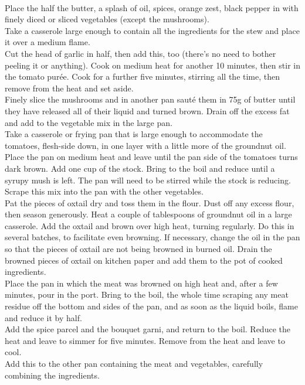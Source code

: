 \documentclass{tufte-book}
\begin{document}
\smallskip
{} 
\\Place the half the butter, a splash of oil, spices, orange zest, black pepper in with finely diced or sliced vegetables (except the mushrooms).
\\Take a casserole large enough to contain all the ingredients for the stew and place it over a medium flame.
\\ Cut the head of garlic in half, then add this, too (there's no need to bother peeling it or anything). Cook on medium heat for another 10 minutes, then stir in the tomato pur\'ee. Cook for a further five minutes, stirring all the time, then remove from the heat and set aside.
\\Finely slice the mushrooms and in another pan sauté them in 75g of butter until they have released all of their liquid and turned brown. Drain off the excess fat and add to the vegetable mix in the large pan.
\\Take a casserole or frying pan that is large enough to accommodate the tomatoes, flesh-side down, in one layer with a little more of the groundnut oil. Place the pan on medium heat and leave until the pan side of the tomatoes turns dark brown. Add one cup of the stock. Bring to the boil and reduce until a syrupy mush is left. The pan will need to be stirred while the stock is reducing. Scrape this mix into the pan with the other vegetables.
\\Pat the pieces of oxtail dry and toss them in the flour. Dust off any excess flour, then season generously. Heat a couple of tablespoons of groundnut oil in a large casserole. Add the oxtail and brown over high heat, turning regularly. Do this in several batches, to facilitate even browning. If necessary, change the oil in the pan so that the pieces of oxtail are not being browned in burned oil. Drain the browned pieces of oxtail on kitchen paper and add them to the pot of cooked ingredients.
\\Place the pan in which the meat was browned on high heat and, after a few minutes, pour in the port. Bring to the boil, the whole time scraping any meat residue off the bottom and sides of the pan, and as soon as the liquid boils, flame and reduce it by half. 
\\Add the spice parcel and the bouquet garni, and return to the boil. Reduce the heat and leave to simmer for five minutes. Remove from the heat and leave to cool.
\\Add this to the other pan containing the meat and vegetables, carefully combining the ingredients.
\end{document}
